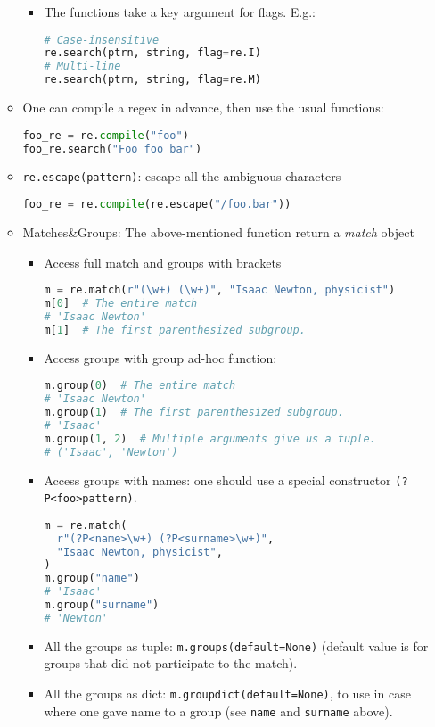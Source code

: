 \documentclass[a4paper,12pt,%
              final%
              ]{article}
\begin{document}
\begin{itemize}
\begin{itemize}
\begin{itemize}
          \item The functions take a key argument for flags. E.g.:
\begin{lstlisting}[language=python]
# Case-insensitive
re.search(ptrn, string, flag=re.I)
# Multi-line
re.search(ptrn, string, flag=re.M)
\end{lstlisting}
        \end{itemize}
      \item One can compile a regex in advance, then use the usual functions:
\begin{lstlisting}[language=python]
foo_re = re.compile("foo")
foo_re.search("Foo foo bar")
\end{lstlisting}
      \item \verb|re.escape(pattern)|: escape all the ambiguous characters
\begin{lstlisting}[language=python]
foo_re = re.compile(re.escape("/foo.bar"))
\end{lstlisting}
      \item Matches\&Groups: The above-mentioned function return a \emph{match} object
        \begin{itemize}
          \item Access full match and groups with brackets
\begin{lstlisting}[language=python]
m = re.match(r"(\w+) (\w+)", "Isaac Newton, physicist")
m[0]  # The entire match
# 'Isaac Newton'
m[1]  # The first parenthesized subgroup.
\end{lstlisting}
          \item Access groups with group ad-hoc function:
\begin{lstlisting}[language=python]
m.group(0)  # The entire match
# 'Isaac Newton'
m.group(1)  # The first parenthesized subgroup.
# 'Isaac'
m.group(1, 2)  # Multiple arguments give us a tuple.
# ('Isaac', 'Newton')
\end{lstlisting}
          \item Access groups with names: one should use a special constructor \texttt{(?P<foo>pattern)}.
\begin{lstlisting}[language=python]
m = re.match(
  r"(?P<name>\w+) (?P<surname>\w+)",
  "Isaac Newton, physicist",
)
m.group("name")
# 'Isaac'
m.group("surname")
# 'Newton'
\end{lstlisting}
          \item All the groups as tuple: \verb|m.groups(default=None)| (default value is for groups that did not participate to the match).
          \item All the groups as dict: \verb|m.groupdict(default=None)|, to use in case where one gave name to a group (see \texttt{name} and \texttt{surname} above).
        \end{itemize}
    \end{itemize}
\end{itemize}
\end{document}
